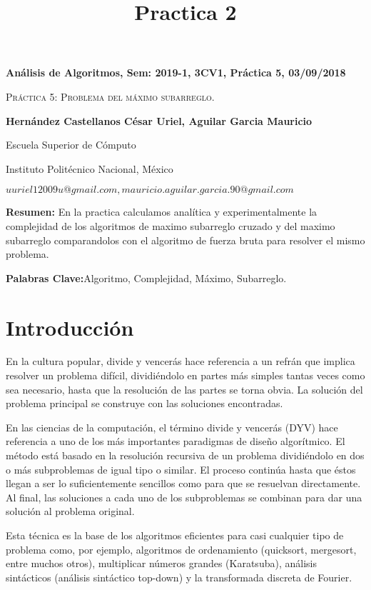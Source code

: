 \documentclass[12pt,twoside]{article}
\title{Practica 2}
\date{}
\begin{document}
\centerline{\bf An\'alisis de Algoritmos, Sem: 2019-1, 3CV1, Pr\'actica 5, 03/09/2018}
\centerline{}
\centerline{}
\begin{center}
\Large{\textsc{Pr\'actica 5: Problema del máximo subarreglo.}}
\end{center}
\centerline{}
\centerline{\bf {Hern\'andez Castellanos C\'esar Uriel, Aguilar Garcia Mauricio}}
\centerline{}
\centerline{Escuela Superior de C\'omputo}
\centerline{Instituto Polit\'ecnico Nacional, M\'exico}
\centerline{$uuriel12009u@gmail.com, mauricio.aguilar.garcia.90@gmail.com$}
\newtheorem{Theorem}{\quad Theorem}[section]
\newtheorem{Definition}[Theorem]{\quad Definition}
\newtheorem{Corollary}[Theorem]{\quad Corollary}
\newtheorem{Lemma}[Theorem]{\quad Lemma}
\newtheorem{Example}[Theorem]{\quad Example}
\bigskip
\textbf{Resumen: } En la practica calculamos analítica y experimentalmente la complejidad de los algoritmos de
maximo subarreglo cruzado y del maximo subarreglo comparandolos con el algoritmo de fuerza bruta para resolver el mismo problema.


\textbf{Palabras Clave:}Algoritmo, Complejidad, Máximo, Subarreglo.


\section{Introducción}

En la cultura popular, divide y vencerás hace referencia a un refrán que implica resolver un problema difícil, dividiéndolo en partes más simples tantas veces como sea necesario, hasta que la resolución de las partes se torna obvia. La solución del problema principal se construye con las soluciones encontradas.

En las ciencias de la computación, el término divide y vencerás (DYV) hace referencia a uno de los más importantes paradigmas de diseño algorítmico. El método está basado en la resolución recursiva de un problema dividiéndolo en dos o más subproblemas de igual tipo o similar. El proceso continúa hasta que éstos llegan a ser lo suficientemente sencillos como para que se resuelvan directamente. Al final, las soluciones a cada uno de los subproblemas se combinan para dar una solución al problema original.

Esta técnica es la base de los algoritmos eficientes para casi cualquier tipo de problema como, por ejemplo, algoritmos de ordenamiento (quicksort, mergesort, entre muchos otros), multiplicar números grandes (Karatsuba), análisis sintácticos (análisis sintáctico top-down) y la transformada discreta de Fourier.
\end{document}
